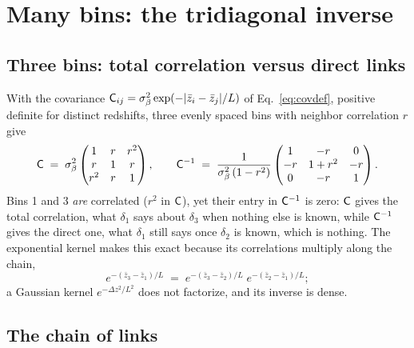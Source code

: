 \section{Many bins: the tridiagonal inverse}
\label{sec:general}

\subsection{Three bins: total correlation versus direct links}
\label{sec:kernel}

With the covariance $\mathsf{C}_{ij} = \sigma_\beta^2
\exp(-|\bar{z}_i - \bar{z}_j|/L)$ of Eq.~\eqref{eq:covdef}, positive
definite for distinct redshifts, three evenly spaced bins with
neighbor correlation $r$ give
\begin{equation}
  \mathsf{C} \;=\; \sigma_\beta^2
  \begin{pmatrix} 1 & r & r^2 \\ r & 1 & r \\ r^2 & r & 1 \end{pmatrix},
  \qquad
  \mathsf{C}^{-1} \;=\; \frac{1}{\sigma_\beta^2\,(1 - r^2)}
  \begin{pmatrix} 1 & -r & 0 \\ -r & 1 + r^2 & -r \\ 0 & -r & 1
  \end{pmatrix}.
  \label{eq:threebin}
\end{equation}
Bins 1 and 3 \emph{are} correlated ($r^2$ in $\mathsf{C}$), yet their entry
in $\mathsf{C}^{-1}$ is zero: $\mathsf{C}$ gives the total correlation, what
$\delta_1$ says about $\delta_3$ when nothing else is known, while
$\mathsf{C}^{-1}$ gives the direct one, what $\delta_1$ still says once
$\delta_2$ is known, which is nothing.  The exponential kernel makes
this exact because its correlations multiply along the chain,
\begin{equation}
  e^{-(\bar{z}_3 - \bar{z}_1)/L}
  \;=\;
  e^{-(\bar{z}_3 - \bar{z}_2)/L}\; e^{-(\bar{z}_2 - \bar{z}_1)/L} ;
  \label{eq:factorize}
\end{equation}
a Gaussian kernel $e^{-\Delta z^2 / L^2}$ does not factorize, and its
inverse is dense.

\subsection{The chain of links}
\label{app:chain}

